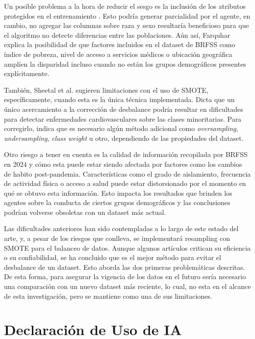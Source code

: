 \documentclass[conference]{IEEEtran}
\begin{document}
Un posible problema a la hora de reducir el sesgo es la inclusión de los atributos protegidos en el entrenamiento \cite{li2023evaluating}. Esto podría generar parcialidad por el agente, en cambio, no agregar las columnas sobre raza y sexo resultaría beneficioso para que el algoritmo no detecte diferencias entre las poblaciones. Aún así, Farquhar \cite{farquhar2026persistent} explica la posibilidad de que factores incluidos en el dataset de BRFSS como índice de pobreza, nivel de acceso a servicios médicos o ubicación geográfica amplíen la disparidad incluso cuando no están los grupos demográficos presentes explícitamente.

También, Sheetal et al. \cite{sheetal2026evaluating} sugieren limitaciones con el uso de SMOTE, específicamente, cuando esta es la única técnica implementada. Dicta que un único acercamiento a la corrección de desbalance podría resultar en dificultades para detectar enfermedades cardiovasculares sobre las clases minoritarias. Para corregirlo, indica que es necesario algún método adicional como \textit{oversampling}, \textit{undersampling}, \textit{class weight} u otro, dependiendo de las propiedades del dataset.  

Otro riesgo a tener en cuenta es la calidad de información recopilada por BRFSS en 2024 y cómo esta puede estar siendo afectada por factores como los cambios de habito post-pandemia. Características como el grado de aislamiento, frecuencia de actividad física o acceso a salud puede estar distorsionado por el momento en qué se obtuvo esta información. Esto impacta los resultados que brinden los agentes sobre la conducta de ciertos grupos demográficos y las conclusiones podrían volverse obsoletas con un dataset más actual.

Las dificultades anteriores han sido contempladas a lo largo de este estado del arte, y, a pesar de los riesgos que conlleva, se implementará resampling con SMOTE para el balanceo de datos. Aunque algunos artículos critican su eficiencia o su confiabilidad, se ha concluido que es el mejor método para evitar el desbalance de un dataset. Esto aborda las dos primeras problemáticas descritas. De esta forma, para asegurar la vigencia de los datos en el futuro sería necesario una comparación con un nuevo dataset más reciente, lo cual, no esta en el alcance de esta investigación, pero se mantiene como una de sus limitaciones.

\section{Declaración de Uso de IA}
\end{document}
